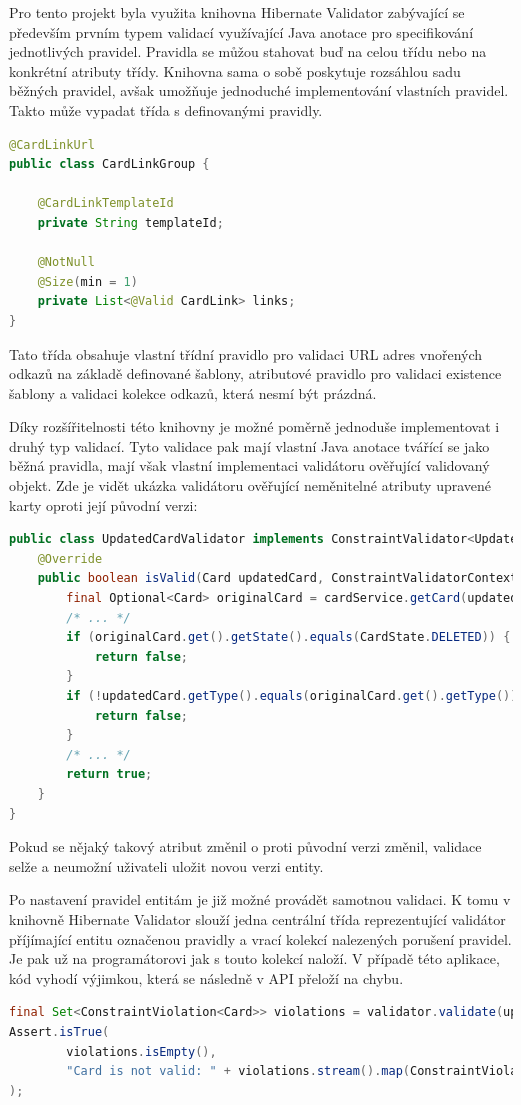 		Pro tento projekt byla využita knihovna Hibernate Validator zabývající se především prvním typem validací
		využívající Java anotace pro specifikování jednotlivých pravidel.
		Pravidla se můžou stahovat buď na celou třídu nebo na konkrétní atributy třídy.
		Knihovna sama o sobě poskytuje rozsáhlou sadu běžných pravidel, avšak umožňuje jednoduché implementování vlastních
		pravidel.
		Takto může vypadat třída s definovanými pravidly.
		\begin{lstlisting}[language=Java]
@CardLinkUrl
public class CardLinkGroup {

	@CardLinkTemplateId
	private String templateId;

	@NotNull
	@Size(min = 1)
	private List<@Valid CardLink> links;
}
		\end{lstlisting}
		Tato třída obsahuje vlastní třídní pravidlo pro validaci \ac{URL} adres vnořených odkazů na základě definované šablony,
		atributové pravidlo pro validaci existence šablony a validaci kolekce odkazů, která nesmí být prázdná.

		Díky rozšířitelnosti této knihovny je možné poměrně jednoduše implementovat i druhý typ validací.
		Tyto validace pak mají vlastní Java anotace tvářící se jako běžná pravidla, mají však vlastní implementaci
		validátoru ověřující validovaný objekt.
		Zde je vidět ukázka validátoru ověřující neměnitelné atributy upravené karty oproti její původní verzi:

		\begin{lstlisting}[language=Java]
public class UpdatedCardValidator implements ConstraintValidator<UpdatedCard, Card> {
	@Override
	public boolean isValid(Card updatedCard, ConstraintValidatorContext context) {
		final Optional<Card> originalCard = cardService.getCard(updatedCard.getId(), true);
		/* ... */
		if (originalCard.get().getState().equals(CardState.DELETED)) {
			return false;
		}
		if (!updatedCard.getType().equals(originalCard.get().getType())) {
			return false;
		}
		/* ... */
		return true;
	}
}
		\end{lstlisting}

		Pokud se nějaký takový atribut změnil o proti původní verzi změnil, validace selže a neumožní uživateli
		uložit novou verzi entity.

		Po nastavení pravidel entitám je již možné provádět samotnou validaci.
		K tomu v knihovně Hibernate Validator slouží jedna centrální třída reprezentující validátor příjímající
		entitu označenou pravidly a vrací kolekcí nalezených porušení pravidel.
		Je pak už na programátorovi jak s touto kolekcí naloží.
		V případě této aplikace, kód vyhodí výjimkou, která se následně v \ac{API} přeloží na chybu.
		\begin{lstlisting}[language=Java]
final Set<ConstraintViolation<Card>> violations = validator.validate(updatedCard);
Assert.isTrue(
		violations.isEmpty(),
		"Card is not valid: " + violations.stream().map(ConstraintViolation::getMessage).collect(Collectors.joining("; "))
);
		\end{lstlisting}


